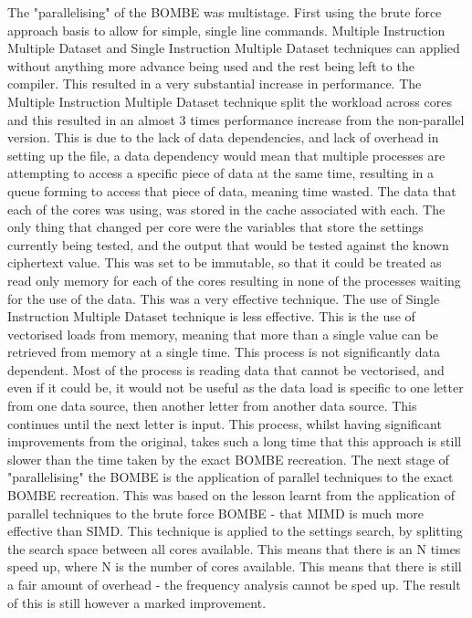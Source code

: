 \documentclass[12pt,a4paper]{article}
\begin{document}
The "parallelising" of the BOMBE was multistage. First using the brute force approach basis to allow for simple, single line commands.  Multiple Instruction Multiple Dataset and Single Instruction Multiple Dataset techniques can applied without anything more advance being used and the rest being left to the compiler. This resulted in a very substantial increase in performance. The Multiple Instruction Multiple Dataset technique split the workload across cores and this resulted in an almost 3 times performance increase from the non-parallel version. This is due to the lack of data dependencies, and lack of overhead in setting up the file, a data dependency would mean that multiple processes are attempting to access a specific piece of data at the same time, resulting in a queue forming to access that piece of data, meaning time wasted. The data that each of the cores was using, was stored in the cache associated with each. The only thing that changed per core were the variables that store the settings currently being tested, and the output that would be tested against the known ciphertext value. This was set to be immutable, so that it could be treated as read only memory for each of the cores resulting in none of the processes waiting for the use of the data. This was a very effective technique. The use of Single Instruction Multiple Dataset technique is less effective. This is the use of vectorised loads from memory, meaning that more than a single value can be retrieved from memory at a single time. This process is not significantly data dependent. Most of the process is reading data that cannot be vectorised, and even if it could be, it would not be useful as the data load is specific to one letter from one data source, then another letter from another data source. This continues until the next letter is input. This process, whilst having significant improvements from the original, takes such a long time that this approach is still slower than the time taken by the exact BOMBE recreation. The next stage of "parallelising" the BOMBE is the application of parallel techniques to the exact BOMBE recreation. This was based on the lesson learnt from the application of parallel techniques to the brute force BOMBE -  that MIMD is much more effective than SIMD. This technique is applied to the settings search, by splitting the search space between all cores available. This means that there is an N times speed up, where N is the number of cores available. This means that there is still a fair amount of overhead - the frequency analysis cannot be sped up. The result of this is still however a marked improvement.\\
\end{document}
